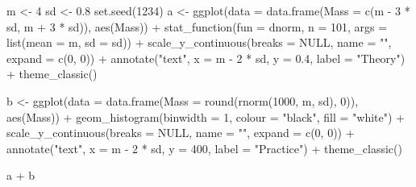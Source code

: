 \documentclass[
  letterpaper,
  DIV=11,
  numbers=noendperiod]{scrreprt}
\newenvironment{Shaded}{\begin{snugshade}}{\end{snugshade}}
\newcommand{\AttributeTok}[1]{\textcolor[rgb]{0.40,0.45,0.13}{#1}}
\newcommand{\ConstantTok}[1]{\textcolor[rgb]{0.56,0.35,0.01}{#1}}
\newcommand{\DecValTok}[1]{\textcolor[rgb]{0.68,0.00,0.00}{#1}}
\newcommand{\FloatTok}[1]{\textcolor[rgb]{0.68,0.00,0.00}{#1}}
\newcommand{\FunctionTok}[1]{\textcolor[rgb]{0.28,0.35,0.67}{#1}}
\newcommand{\NormalTok}[1]{\textcolor[rgb]{0.00,0.23,0.31}{#1}}
\newcommand{\OtherTok}[1]{\textcolor[rgb]{0.00,0.23,0.31}{#1}}
\newcommand{\SpecialCharTok}[1]{\textcolor[rgb]{0.37,0.37,0.37}{#1}}
\newcommand{\StringTok}[1]{\textcolor[rgb]{0.13,0.47,0.30}{#1}}
\begin{document}
\begin{Shaded}
\begin{Highlighting}[]
\NormalTok{m }\OtherTok{\textless{}{-}} \DecValTok{4}
\NormalTok{sd }\OtherTok{\textless{}{-}} \FloatTok{0.8}
\FunctionTok{set.seed}\NormalTok{(}\DecValTok{1234}\NormalTok{)}
\NormalTok{a }\OtherTok{\textless{}{-}} \FunctionTok{ggplot}\NormalTok{(}\AttributeTok{data =} \FunctionTok{data.frame}\NormalTok{(}\AttributeTok{Mass =} \FunctionTok{c}\NormalTok{(m }\SpecialCharTok{{-}} \DecValTok{3} \SpecialCharTok{*}\NormalTok{ sd, m }\SpecialCharTok{+} \DecValTok{3} \SpecialCharTok{*}\NormalTok{ sd)), }\FunctionTok{aes}\NormalTok{(Mass)) }\SpecialCharTok{+}
  \FunctionTok{stat\_function}\NormalTok{(}\AttributeTok{fun =}\NormalTok{ dnorm, }\AttributeTok{n =} \DecValTok{101}\NormalTok{, }
                \AttributeTok{args =} \FunctionTok{list}\NormalTok{(}\AttributeTok{mean =}\NormalTok{ m, }\AttributeTok{sd =}\NormalTok{ sd)) }\SpecialCharTok{+} 
  \FunctionTok{scale\_y\_continuous}\NormalTok{(}\AttributeTok{breaks =} \ConstantTok{NULL}\NormalTok{, }\AttributeTok{name =} \StringTok{""}\NormalTok{, }
                     \AttributeTok{expand =} \FunctionTok{c}\NormalTok{(}\DecValTok{0}\NormalTok{, }\DecValTok{0}\NormalTok{)) }\SpecialCharTok{+}
  \FunctionTok{annotate}\NormalTok{(}\StringTok{"text"}\NormalTok{, }\AttributeTok{x =}\NormalTok{ m }\SpecialCharTok{{-}} \DecValTok{2} \SpecialCharTok{*}\NormalTok{ sd, }\AttributeTok{y =} \FloatTok{0.4}\NormalTok{,}
           \AttributeTok{label =} \StringTok{"Theory"}\NormalTok{) }\SpecialCharTok{+}
  \FunctionTok{theme\_classic}\NormalTok{()}

\NormalTok{b }\OtherTok{\textless{}{-}} \FunctionTok{ggplot}\NormalTok{(}\AttributeTok{data =} \FunctionTok{data.frame}\NormalTok{(}\AttributeTok{Mass =} \FunctionTok{round}\NormalTok{(}\FunctionTok{rnorm}\NormalTok{(}\DecValTok{1000}\NormalTok{, m, sd), }\DecValTok{0}\NormalTok{)), }\FunctionTok{aes}\NormalTok{(Mass)) }\SpecialCharTok{+}
  \FunctionTok{geom\_histogram}\NormalTok{(}\AttributeTok{binwidth =} \DecValTok{1}\NormalTok{, }\AttributeTok{colour =} \StringTok{"black"}\NormalTok{, }\AttributeTok{fill =} \StringTok{"white"}\NormalTok{) }\SpecialCharTok{+}
  \FunctionTok{scale\_y\_continuous}\NormalTok{(}\AttributeTok{breaks =} \ConstantTok{NULL}\NormalTok{, }\AttributeTok{name =} \StringTok{""}\NormalTok{,}
                     \AttributeTok{expand =} \FunctionTok{c}\NormalTok{(}\DecValTok{0}\NormalTok{, }\DecValTok{0}\NormalTok{)) }\SpecialCharTok{+}
  \FunctionTok{annotate}\NormalTok{(}\StringTok{"text"}\NormalTok{, }\AttributeTok{x =}\NormalTok{ m }\SpecialCharTok{{-}} \DecValTok{2} \SpecialCharTok{*}\NormalTok{ sd, }\AttributeTok{y =} \DecValTok{400}\NormalTok{,}
           \AttributeTok{label =} \StringTok{"Practice"}\NormalTok{) }\SpecialCharTok{+}
  \FunctionTok{theme\_classic}\NormalTok{()}

\NormalTok{a }\SpecialCharTok{+}\NormalTok{ b}
\end{Highlighting}
\end{Shaded}
\end{document}
